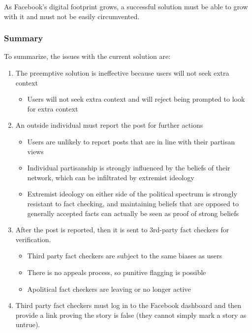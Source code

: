 \documentclass[preprint,review,12pt]{elsarticle}
\begin{document}
As Facebook's digital footprint grows, a successful solution must be able to grow with it and must not be easily circumvented. 



\subsubsection{Summary}
\label{sec: summary with issues with current solutions}
To summarize, the issues with the current solution are:
\renewcommand{\labelenumii}{\Roman{enumii}}
\begin{enumerate}
\item The preemptive solution is ineffective because users will not seek extra context
\begin{itemize}
\item Users will not seek extra context and will reject being prompted to look for extra context
\end{itemize}
\item An outside individual must report the post for further actions
 \begin{itemize}
     \item Users are unlikely to report posts that are in line with their partisan views
     \item Individual partisanship is strongly influenced by the beliefs of their network, which can be infiltrated by extremist ideology
     \item Extremist ideology on either side of the political spectrum is strongly resistant to fact checking, and maintaining beliefs that are opposed to generally accepted facts can actually be seen as proof of strong beliefs
    \end{itemize}
     \item After the post is reported, then it is  sent to 3rd-party fact checkers for verification. 
     \begin{itemize}
         \item Third party fact checkers are subject to the same biases as users
         \item There is no appeals process, so punitive flagging is possible
         \item Apolitical fact checkers are leaving or no longer active
     \end{itemize}
     \item Third party fact checkers must log in to the Facebook dashboard and then provide a link proving the story is false (they cannot simply mark a story as untrue).

\end{enumerate}
\end{document}
